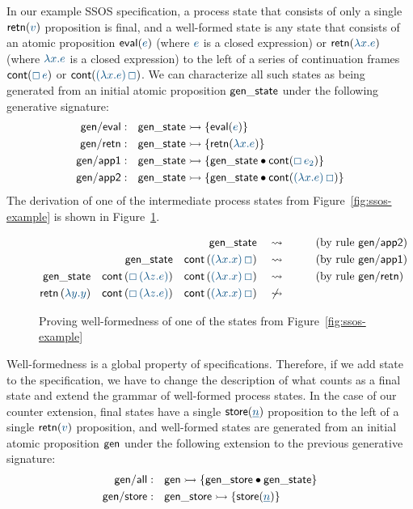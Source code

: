 In our example SSOS specification, a process state that consists of
only a single ${\sf retn}(\obj{v})$ proposition is final, and a
well-formed state is any state that consists of an atomic proposition ${\sf
  eval}(\obj{e})$ (where $\obj{e}$ is a closed expression) or ${\sf
  retn}(\obj{\lambda x. e})$ (where $\obj{\lambda x. e}$ is a closed
expression) to the left 
of a series of continuation frames ${\sf cont}(\obj{\Box\,e})$ 
or ${\sf cont}(\obj{(\lambda x.e)\,\Box})$. We can characterize 
all such states as being generated from an initial atomic 
proposition ${\sf gen\_state}$ under the following generative
signature:
\begin{align*}
{\sf gen/eval} &:~~
  {\sf gen\_state} \lefti \{ {\sf eval}(\obj{e}) \}
\\
{\sf gen/retn} &:~~
  {\sf gen\_state} \lefti \{ {\sf retn}(\obj{\lambda x.e}) \}
\\
{\sf gen/app1} &:~~
  {\sf gen\_state} 
    \lefti \{ {\sf gen\_state} \fuse {\sf cont}(\obj{\Box\,e_2}) \}
\\
{\sf gen/app2} &:~~
  {\sf gen\_state} 
    \lefti \{ {\sf gen\_state} \fuse {\sf cont}(\obj{(\lambda x.e)\,\Box}) \}
\end{align*}
The derivation of one of the intermediate process
states from Figure~\ref{fig:ssos-example} is shown in
Figure~\ref{fig:ssos-gen}.

\begin{figure}
\begin{align*}
{\sf gen\_state}
& ~~~\rightsquigarrow~~ \tag{by rule ${\sf gen/app2}$}\\
{\sf gen\_state} \quad
{\sf cont}\,(\obj{(\lambda x.x)\,\Box})
& ~~~\rightsquigarrow~~ \tag{by rule ${\sf gen/app1}$}\\
{\sf gen\_state} \quad
{\sf cont}\,(\obj{\Box\,(\lambda z.e)}) \quad
{\sf cont}\,(\obj{(\lambda x.x)\,\Box})
& ~~~\rightsquigarrow~~ \tag{by rule ${\sf gen/retn}$}\\
{\sf retn}\,(\obj{\lambda y.y}) \quad
{\sf cont}\,(\obj{\Box\,(\lambda z.e)}) \quad
{\sf cont}\,(\obj{(\lambda x.x)\,\Box})
& ~~~\not\rightsquigarrow~~ 
\end{align*}
\caption{Proving well-formedness of one of the states from
  Figure~\ref{fig:ssos-example}}
\label{fig:ssos-gen}
\end{figure}

Well-formedness is a global property of specifications. Therefore, 
if we add state to the specification, we have to change the description of
what counts as a final state and extend the grammar of well-formed
process states. In the case of our counter extension, final states
have a single ${\sf store}(\obj{\underline n})$ proposition to the left of a
single ${\sf retn}(\obj{v})$ proposition, and well-formed states are
generated from an initial atomic proposition ${\sf gen}$ under the
following extension to the previous generative signature:
%
\begin{align*}
{\sf gen/all} &:~~ {\sf gen} \lefti \{ {\sf gen\_store} \fuse {\sf
  gen\_state} \}
\\
{\sf gen/store} &:~~ {\sf gen\_store} \lefti \{ {\sf
  store}(\obj{\underline n}) \}
\end{align*}

